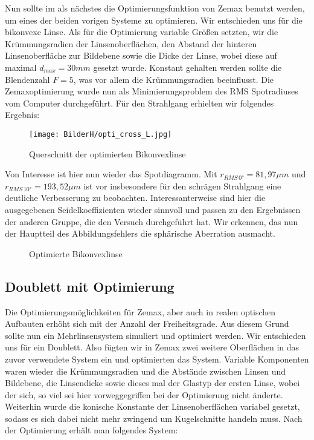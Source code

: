 \documentclass[twoside,colorback,accentcolor=tud4c,11pt]{tudreport}
\begin{document}
	Nun sollte im als nächstes die Optimierungsfunktion von Zemax benutzt werden, um eines der beiden vorigen Systeme zu optimieren. Wir entschieden uns für die bikonvexe Linse. Als für die Optimierung variable Größen setzten, wir die Krümmungsradien der Linsenoberflächen, den Abstand der hinteren Linsenoberfläche zur Bildebene sowie die Dicke der Linse, wobei diese auf maximal $d_{max} = 30 mm$ gesetzt wurde. Konstant gehalten werden sollte die Blendenzahl $F =5$, was vor allem die Krümmungsradien beeinflusst. Die Zemaxoptimierung wurde nun als Minimierungsproblem des RMS Spotradiuses vom Computer durchgeführt. Für den Strahlgang erhielten wir folgendes Ergebnis: 
	
	\begin{figure}[H]
\centering
   	\begin{minipage}[b]{\textwidth}
   	\centering
   	\texttt{[image: BilderH/opti\_cross\_L.jpg]}
   	\caption{Querschnitt der optimierten Bikonvexlinse}
  	\end{minipage}
\end{figure}
	
	Von Interesse ist hier nun wieder das Spotdiagramm. Mit $r_{RMS \, 0°} = 81,97 \mu m $ und $r_{RMS \, 10°} = 193,52 \mu m $ ist vor insbesondere für den schrägen Strahlgang eine deutliche Verbesserung zu beobachten. Interessanterweise sind hier die ausgegebenen Seidelkoeffizienten wieder sinnvoll und passen zu den Ergebnissen der anderen Gruppe, die den Versuch durchgeführt hat. Wir erkennen, das nun der Hauptteil des Abbildungsfehlers die sphärische Aberration ausmacht. 
	
	\begin{figure}[H]
\centering
  \quad
  \quad   
  \caption{Optimierte Bikonvexlinse}
\end{figure}
	
	\subsection{Doublett mit Optimierung}
	
	Die Optimierungsmöglichkeiten für Zemax, aber auch in realen optischen Aufbauten erhöht sich mit der Anzahl der Freiheitsgrade. Aus diesem Grund sollte nun ein Mehrlinsensystem simuliert und optimiert werden. Wir entschieden uns für ein Doublett. Also fügten wir in Zemax zwei weitere Oberflächen in das zuvor verwendete System ein und optimierten das System. Variable Komponenten waren wieder die Krümmungsradien und die Abstände zwischen Linsen und Bildebene, die Linsendicke sowie dieses mal der Glastyp der ersten Linse, wobei der sich, so viel sei hier vorweggegriffen bei der Optimierung nicht änderte. Weiterhin wurde die konische Konstante der Linsenoberflächen variabel gesetzt, sodass es sich dabei nicht mehr zwingend um Kugelschnitte handeln muss. Nach der Optimierung erhält man folgendes System:
	
\end{document}
